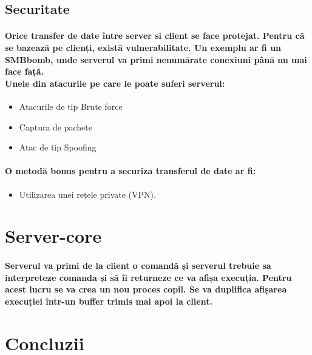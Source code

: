 \documentclass{article}
\begin{document}
	
	
	
	\newpage
	\subsection{Securitate}
	
	\paragraph{
		Orice transfer de date între server si client se face protejat. Pentru că se bazează pe clienți, există vulnerabilitate. Un exemplu ar fi un SMBbomb, unde serverul va primi nenumărate conexiuni până nu mai face față.
		\\Unele din atacurile pe care le poate suferi serverul:
	}
	\begin{itemize}
		\item Atacurile de tip Brute force
		\item Captura de pachete
		\item Atac de tip Spoofing
	\end{itemize}
	
	\paragraph{
		O metodă bonus pentru a securiza transferul de date ar fi:
	}
	\begin{itemize}
		\item Utilizarea unei rețele private (VPN).
		 
	\end{itemize}
	
	
	
	

	
	\section{Server-core}
	
	\paragraph{Serverul va primi de la client o comandă și serverul trebuie sa interpreteze comanda și să îi returneze ce va afișa execuția. Pentru acest lucru se va crea un nou proces copil. Se va duplifica afișarea execuției într-un buffer trimis mai apoi la client.\\
	}

	
	

	\newpage
	\section{Concluzii}
\end{document}
